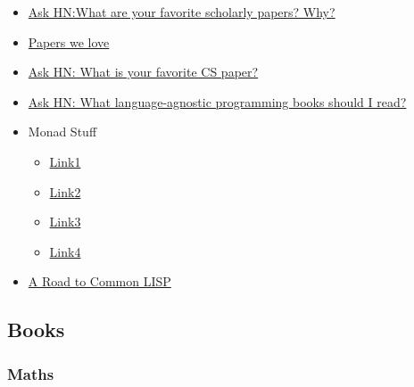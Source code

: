 \begin{itemize}
	
	\item \href{files/Ask HN_ What are your favorite scholarly papers_ Why_ _ Hacker News.pdf}{Ask HN:What are your favorite scholarly papers? Why?}
	
	\item \href{https://github.com/papers-we-love/papers-we-love}{Papers we
		love}

	\item \href{files/Ask HN_ What is your favorite CS paper_ _ Hacker News.pdf}{Ask HN: What is your favorite CS paper?}

	\item \href{files/Ask HN_ What language-agnostic programming books should I read_ _ Hacker News.pdf}{Ask HN: What language-agnostic programming books should I read?}

	\item Monad Stuff

	\begin{itemize}
		\item
		\href{http://bartoszmilewski.com/2015/05/11/using-monads-in-c-to-solve-constraints-1-the-list-monad/}{Link1}
		\item
		\href{http://blog.jle.im/entry/unique-sample-drawing-searches-with-list-and-statet}{Link2}
		\item
		\href{http://www.berniepope.id.au/docs/scala_monads.pdf}{Link3}
		\item
		\href{http://james-iry.blogspot.co.at/2007/10/monads-are-elephants-part-3.html}{Link4}
	\end{itemize}

	\item \href{files/A_Road_to_Common_LISP_Steve_Losh.pdf}{A Road to Common LISP}

\end{itemize}

\subsection{Books}

\subsubsection{Maths}

